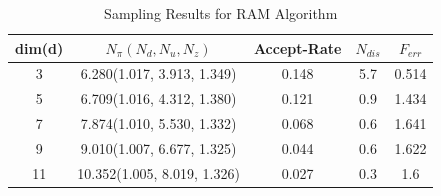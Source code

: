 \documentclass{article}
\begin{document}
\begin{table}[H]
\caption{Sampling Results for RAM Algorithm} %
\centering %
\begin{tabular}{c c c c c } %
\hline\hline %
dim(d) & $N_\pi(N_d,N_u,N_z)$ & Accept-Rate & $N_{dis}$ & $F_{err}$ \\ [0.5ex] %
\hline %
3 & 6.280(1.017, 3.913, 1.349) & 0.148 & 5.7 &0.514\\ %
5 & 6.709(1.016, 4.312, 1.380) & 0.121 & 0.9 &1.434\\
7 & 7.874(1.010, 5.530, 1.332) & 0.068 & 0.6 &1.641\\
9 & 9.010(1.007, 6.677, 1.325) & 0.044 & 0.6 &1.622\\
11 & 10.352(1.005, 8.019, 1.326) & 0.027 & 0.3 &1.6\\ [1ex] %
\hline %
\end{tabular}
\label{table:nonlin} %
\end{table}
\end{document}
